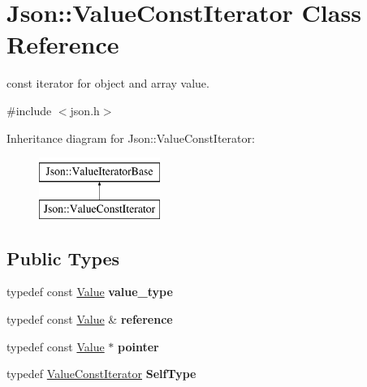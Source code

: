 \hypertarget{class_json_1_1_value_const_iterator}{}\section{Json\+:\+:Value\+Const\+Iterator Class Reference}
\label{class_json_1_1_value_const_iterator}


const iterator for object and array value.  




{\ttfamily \#include $<$json.\+h$>$}

Inheritance diagram for Json\+:\+:Value\+Const\+Iterator\+:\begin{figure}[H]
\begin{center}
\leavevmode
\includegraphics[height=2.000000cm]{class_json_1_1_value_const_iterator}
\end{center}
\end{figure}
\subsection*{Public Types}
\begin{DoxyCompactItemize}
\item 
\mbox{\label{class_json_1_1_value_const_iterator_aa5f1707dcef4bfe73e23ddc14dbe760d}} 
typedef const \hyperlink{class_json_1_1_value}{Value} {\bfseries value\+\_\+type}
\item 
\mbox{\label{class_json_1_1_value_const_iterator_aa9b05c6a37cd352ea1ee6e13b816f709}} 
typedef const \hyperlink{class_json_1_1_value}{Value} \& {\bfseries reference}
\item 
\mbox{\label{class_json_1_1_value_const_iterator_a400136bd8bc09e9fddec0785fa2cff14}} 
typedef const \hyperlink{class_json_1_1_value}{Value} $\ast$ {\bfseries pointer}
\item 
\mbox{\label{class_json_1_1_value_const_iterator_a0c2e33e7eb5a80dd8709fb28ece83933}} 
typedef \hyperlink{class_json_1_1_value_const_iterator}{Value\+Const\+Iterator} {\bfseries Self\+Type}
\end{DoxyCompactItemize}
